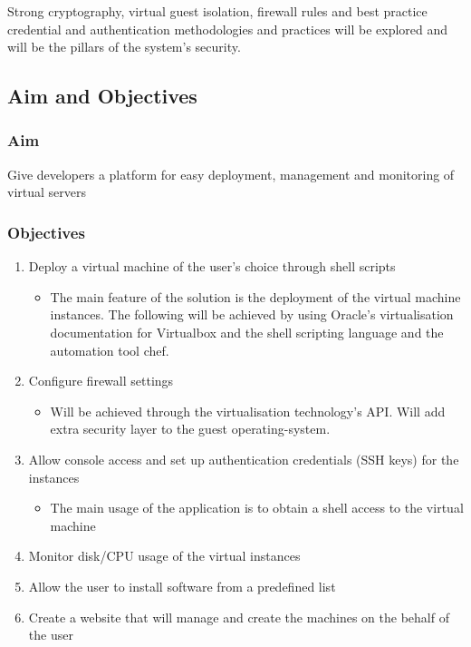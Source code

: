 \documentclass{article}
\begin{document}
   Strong cryptography, virtual guest isolation, firewall rules and best practice credential and authentication methodologies and practices will be explored and will be the pillars of the system's security.
  \subsection{Aim and Objectives}
	  \subsubsection{Aim}
	  Give developers a platform for easy deployment, management and monitoring of virtual servers
	  \subsubsection{Objectives}
	  
	  \begin{enumerate}
	  	\item Deploy a virtual machine of the user's choice through shell scripts
		  	\begin{itemize}
		  		\item The main feature of the solution is the deployment of the virtual machine instances. The following will be achieved by using Oracle's virtualisation documentation for Virtualbox and the shell scripting language and the automation tool chef.
		    \end{itemize}

	  	\item Configure firewall settings
		  	\begin{itemize}
		  		\item Will be achieved through the virtualisation technology's API. Will add extra security layer to the guest \gls{operating-system}.
		  	\end{itemize}

	  	\item Allow console access and set up authentication credentials (SSH keys) for the instances
		  	\begin{itemize}
		  		\item The main usage of the application is to obtain a shell access to the virtual machine
		  	\end{itemize}
	  	\item Monitor disk/CPU usage of the virtual instances
	  	\item Allow the user to install software from a predefined list
	  	\item Create a website that will manage and create the machines on the behalf of the user 	
	  \end{enumerate}
\end{document}
